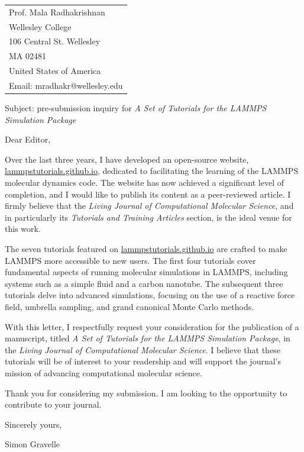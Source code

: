 \documentclass{article}
\begin{document}
\bigskip %


\begin{tabular}{@{} l}
	Prof. Mala Radhakrishnan \\
    Wellesley College \\
    106 Central St. Wellesley \\
    MA 02481\\
    United States of America \\
    Email: mradhakr@wellesley.edu
\end{tabular}

\bigskip 

Subject: pre-submission inquiry for \textit{A Set of Tutorials for the LAMMPS Simulation Package}

\bigskip 

Dear Editor,

\bigskip 

Over the last three years, I have developed an open-source website, \href{https://lammpstutorials.github.io/}{lammpstutorials.github.io}, dedicated  to facilitating the learning of the LAMMPS molecular dynamics code. The website has now achieved a significant level of completion, and I would like to publish its content as a peer-reviewed article. I firmly believe that the \textit{Living Journal of Computational Molecular Science}, and in particularly its \textit{Tutorials and Training Articles} section, is the ideal venue for this work.

The seven tutorials featured on \href{https://lammpstutorials.github.io/}{lammpstutorials.github.io} are crafted to make LAMMPS more accessible to new users. The first four tutorials cover fundamental aspects of running molecular simulations in LAMMPS, including systems such as a simple fluid and a carbon nanotube. The subsequent three tutorials delve into advanced simulations, focusing on the use of a reactive force field, umbrella sampling, and grand canonical Monte Carlo methods.

With this letter, I respectfully request your consideration for the publication of a manuscript, titled \textit{A Set of Tutorials for the LAMMPS Simulation Package}, in the \textit{Living Journal of Computational Molecular Science}. I believe that these tutorials will be of interest to your readership and will support the journal's mission of advancing computational molecular science.

Thank you for considering my submission. I am looking to the opportunity to contribute to your journal.

\bigskip %

Sincerely yours,

\bigskip %

Simon Gravelle
\end{document}
